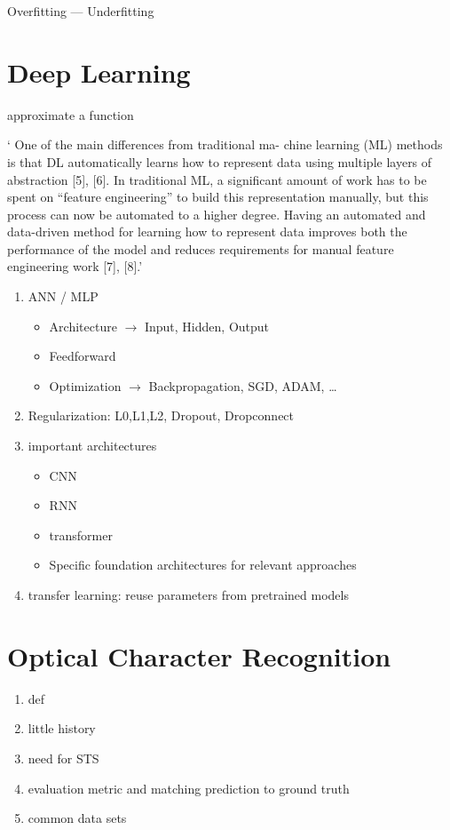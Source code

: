 Overfitting --- Underfitting

\section{Deep Learning}
approximate a function

` One of the main differences from traditional ma- chine learning (ML) methods is that DL
automatically learns how to represent data using multiple layers of abstraction [5], [6].
In traditional ML, a significant amount of work has to be spent on “feature engineering” to
build this representation manually, but this process can now be automated to a higher degree.
Having an automated and data-driven method for learning how to represent data improves both the
performance of the model and reduces requirements for manual feature engineering work
[7], [8].'~\citep{arpteg_software_2018}

\begin{enumerate}
    \item ANN / MLP %
        \begin{itemize}
            \item Architecture $\rightarrow$ Input, Hidden, Output
            \item Feedforward
            \item Optimization $\rightarrow$ Backpropagation, SGD, ADAM, \ldots
        \end{itemize}
    \item Regularization: L0,L1,L2, Dropout, Dropconnect
    \item important architectures
        \begin{itemize}
            \item CNN %
            \item RNN %
            \item transformer
            \item Specific foundation architectures for relevant approaches
        \end{itemize}
    \item transfer learning: reuse parameters from pretrained models\\
\end{enumerate}

\section{Optical Character Recognition}

\begin{enumerate}
    \item def
    \item little history
    \item need for \ac{STS}
    \item evaluation metric and matching prediction to ground truth
    \item common data sets
\end{enumerate}
